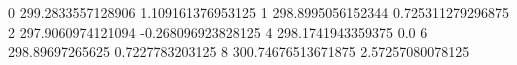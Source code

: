 0 299.2833557128906 1.109161376953125
1 298.8995056152344 0.725311279296875
2 297.9060974121094 -0.268096923828125
4 298.1741943359375 0.0
6 298.89697265625 0.7227783203125
8 300.74676513671875 2.57257080078125
